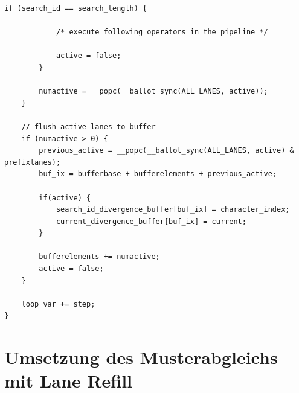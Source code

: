 \begin{lstlisting}[language=MyC++,
caption=Umsetzung der String-Selektion mit Lane Refill]
		if (search_id == search_length) {
		
			/* execute following operators in the pipeline */
		
			active = false;
		}
		
		numactive = __popc(__ballot_sync(ALL_LANES, active));
	}
	
	// flush active lanes to buffer
	if (numactive > 0) {
		previous_active = __popc(__ballot_sync(ALL_LANES, active) & prefixlanes);
		buf_ix = bufferbase + bufferelements + previous_active;
		
		if(active) {
			search_id_divergence_buffer[buf_ix] = character_index;
			current_divergence_buffer[buf_ix] = current;
		}
		
		bufferelements += numactive;
		active = false;
	}
	
	loop_var += step;
}
\end{lstlisting}

\chapter{Umsetzung des Musterabgleichs mit Lane Refill}
\label{apx:regex_lane_refill}

